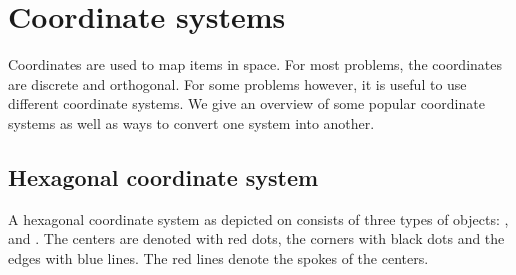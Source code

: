 \section{Coordinate systems}
Coordinates are used to map items in space. For most problems, the coordinates are discrete and orthogonal. For some problems however, it is useful to use different coordinate systems. We give an overview of some popular coordinate systems as well as ways to convert one system into another.
\subsection{Hexagonal coordinate system}
A hexagonal coordinate system as depicted on  consists of three types of objects: ,  and . The centers are denoted with red dots, the corners with black dots and the edges with blue lines. The red lines denote the spokes of the centers.
